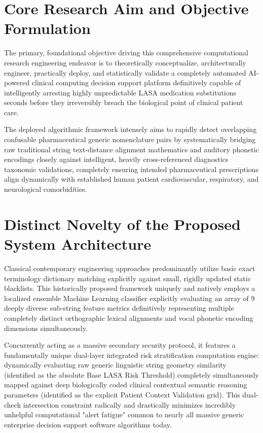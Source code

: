 \documentclass[12pt,a4paper]{report}
\begin{document}
\section{Core Research Aim and Objective Formulation}
The primary, foundational objective driving this comprehensive computational research engineering endeavor is to theoretically conceptualize, architecturally engineer, practically deploy, and statistically validate a completely automated AI-powered clinical computing decision support platform definitively capable of intelligently arresting highly unpredictable LASA medication substitutions seconds before they irreversibly breach the biological point of clinical patient care.

The deployed algorithmic framework intensely aims to rapidly detect overlapping confusable pharmaceutical generic nomenclature pairs by systematically bridging raw traditional string text-distance alignment mathematics and auditory phonetic encodings closely against intelligent, heavily cross-referenced diagnostics taxonomic validations, completely ensuring intended pharmaceutical prescriptions align dynamically with established human patient cardiovascular, respiratory, and neurological comorbidities.

\section{Distinct Novelty of the Proposed System Architecture}
Classical contemporary engineering approaches predominantly utilize basic exact terminology dictionary matching explicitly against small, rigidly updated static blacklists. This historically proposed framework uniquely and natively employs a localized ensemble Machine Learning classifier explicitly evaluating an array of 9 deeply diverse sub-string feature metrics definitively representing multiple completely distinct orthographic lexical alignments and vocal phonetic encoding dimensions simultaneously.

Concurrently acting as a massive secondary security protocol, it features a fundamentally unique dual-layer integrated risk stratification computation engine: dynamically evaluating raw generic linguistic string geometry similarity (identified as the absolute Base LASA Risk Threshold) completely simultaneously mapped against deep biologically coded clinical contextual semantic reasoning parameters (identified as the explicit Patient Context Validation grid). This dual-check intersection constraint radically and drastically minimizes incredibly unhelpful computational "alert fatigue" common to nearly all massive generic enterprise decision support software algorithms today.
\end{document}

